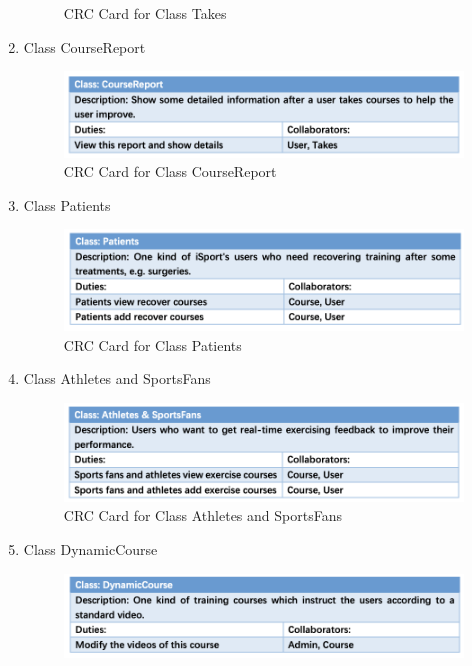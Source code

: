 \documentclass[16pt]{scrreprt}
\begin{document}
\begin{enumerate}
\begin{figure}[H]
            \caption{CRC Card for Class Takes}
            \label{fig:takes}
        \end{figure}
    \item Class CourseReport
        \begin{figure}[H]
            \centering
            \includegraphics[width=1.1\textwidth]{figures/CourseReport.png}
            \caption{CRC Card for Class CourseReport}
            \label{fig:cr}
        \end{figure}
    \item Class Patients
        \begin{figure}[H]
            \centering
            \includegraphics[width=1.1\textwidth]{figures/Patients.png}
            \caption{CRC Card for Class Patients}
            \label{fig:patients}
        \end{figure}
    \item Class Athletes and SportsFans
        \begin{figure}[H]
            \centering
            \includegraphics[width=1.1\textwidth]{figures/AthletesSports.png}
            \caption{CRC Card for Class Athletes and SportsFans}
            \label{fig:a_and_s}
        \end{figure}
    \item Class DynamicCourse
        \begin{figure}[H]
            \centering
            \includegraphics[width=1.1\textwidth]{figures/dynamic.png}

\end{figure}
\end{enumerate}
\end{document}

